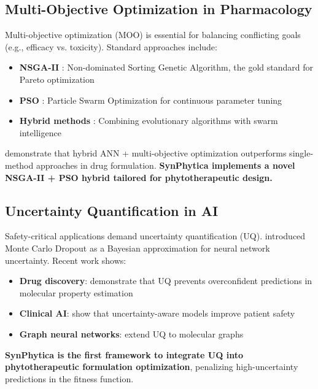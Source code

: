 \documentclass[12pt, a4paper]{article}
\begin{document}
\subsection{Multi-Objective Optimization in Pharmacology}

Multi-objective optimization (MOO) is essential for balancing conflicting goals (e.g., efficacy vs. toxicity). Standard approaches include:

\begin{itemize}
    \item \textbf{NSGA-II} \citep{Deb2002}: Non-dominated Sorting Genetic Algorithm, the gold standard for Pareto optimization
    \item \textbf{PSO} \citep{Kennedy1995}: Particle Swarm Optimization for continuous parameter tuning
    \item \textbf{Hybrid methods} \citep{HybridMOO2023, GPPSO2024}: Combining evolutionary algorithms with swarm intelligence
\end{itemize}

\citet{HybridANN2024} demonstrate that hybrid ANN + multi-objective optimization outperforms single-method approaches in drug formulation. \textbf{SynPhytica implements a novel NSGA-II + PSO hybrid tailored for phytotherapeutic design.}

\subsection{Uncertainty Quantification in AI}

Safety-critical applications demand uncertainty quantification (UQ). \citet{Gal2016} introduced Monte Carlo Dropout as a Bayesian approximation for neural network uncertainty. Recent work shows:

\begin{itemize}
    \item \textbf{Drug discovery}: \citet{UQ2022} demonstrate that UQ prevents overconfident predictions in molecular property estimation
    \item \textbf{Clinical AI}: \citet{UQClinical2025} show that uncertainty-aware models improve patient safety
    \item \textbf{Graph neural networks}: \citet{UQGNN2024} extend UQ to molecular graphs
\end{itemize}

\textbf{SynPhytica is the first framework to integrate UQ into phytotherapeutic formulation optimization}, penalizing high-uncertainty predictions in the fitness function.
\end{document}
